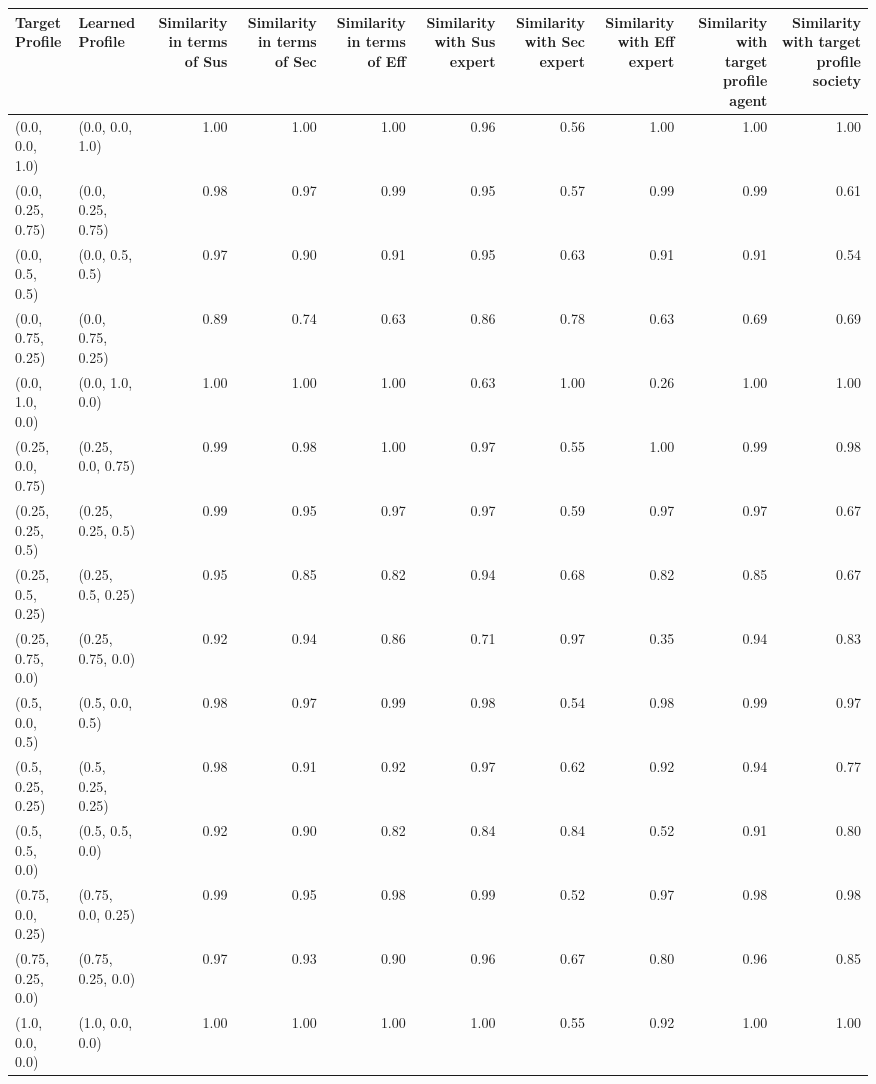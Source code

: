 \begin{tabular}{llrrrrrrrr}
\toprule
Target Profile & Learned Profile & Similarity in terms of Sus & Similarity in terms of Sec & Similarity in terms of Eff & Similarity with Sus expert & Similarity with Sec expert & Similarity with Eff expert & Similarity with target profile agent & Similarity with target profile society \\
\midrule
(0.0, 0.0, 1.0) & (0.0, 0.0, 1.0) & 1.00 & 1.00 & 1.00 & 0.96 & 0.56 & 1.00 & 1.00 & 1.00 \\
(0.0, 0.25, 0.75) & (0.0, 0.25, 0.75) & 0.98 & 0.97 & 0.99 & 0.95 & 0.57 & 0.99 & 0.99 & 0.61 \\
(0.0, 0.5, 0.5) & (0.0, 0.5, 0.5) & 0.97 & 0.90 & 0.91 & 0.95 & 0.63 & 0.91 & 0.91 & 0.54 \\
(0.0, 0.75, 0.25) & (0.0, 0.75, 0.25) & 0.89 & 0.74 & 0.63 & 0.86 & 0.78 & 0.63 & 0.69 & 0.69 \\
(0.0, 1.0, 0.0) & (0.0, 1.0, 0.0) & 1.00 & 1.00 & 1.00 & 0.63 & 1.00 & 0.26 & 1.00 & 1.00 \\
(0.25, 0.0, 0.75) & (0.25, 0.0, 0.75) & 0.99 & 0.98 & 1.00 & 0.97 & 0.55 & 1.00 & 0.99 & 0.98 \\
(0.25, 0.25, 0.5) & (0.25, 0.25, 0.5) & 0.99 & 0.95 & 0.97 & 0.97 & 0.59 & 0.97 & 0.97 & 0.67 \\
(0.25, 0.5, 0.25) & (0.25, 0.5, 0.25) & 0.95 & 0.85 & 0.82 & 0.94 & 0.68 & 0.82 & 0.85 & 0.67 \\
(0.25, 0.75, 0.0) & (0.25, 0.75, 0.0) & 0.92 & 0.94 & 0.86 & 0.71 & 0.97 & 0.35 & 0.94 & 0.83 \\
(0.5, 0.0, 0.5) & (0.5, 0.0, 0.5) & 0.98 & 0.97 & 0.99 & 0.98 & 0.54 & 0.98 & 0.99 & 0.97 \\
(0.5, 0.25, 0.25) & (0.5, 0.25, 0.25) & 0.98 & 0.91 & 0.92 & 0.97 & 0.62 & 0.92 & 0.94 & 0.77 \\
(0.5, 0.5, 0.0) & (0.5, 0.5, 0.0) & 0.92 & 0.90 & 0.82 & 0.84 & 0.84 & 0.52 & 0.91 & 0.80 \\
(0.75, 0.0, 0.25) & (0.75, 0.0, 0.25) & 0.99 & 0.95 & 0.98 & 0.99 & 0.52 & 0.97 & 0.98 & 0.98 \\
(0.75, 0.25, 0.0) & (0.75, 0.25, 0.0) & 0.97 & 0.93 & 0.90 & 0.96 & 0.67 & 0.80 & 0.96 & 0.85 \\
(1.0, 0.0, 0.0) & (1.0, 0.0, 0.0) & 1.00 & 1.00 & 1.00 & 1.00 & 0.55 & 0.92 & 1.00 & 1.00 \\
\bottomrule
\end{tabular}
